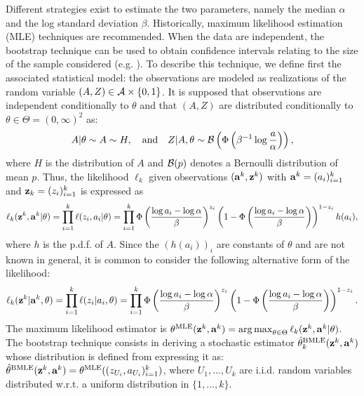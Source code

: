 Different strategies exist to estimate the two parameters, namely the median $\alpha$ and the log standard deviation $\beta$. Historically, maximum likelihood estimation (MLE) techniques are recommended.  %
When the data are independent, the bootstrap technique can be used to obtain confidence intervals relating to the size of the sample considered (e.g. \cite{shinozuka_statistical_2000,zentner_numerical_2010,wang_influence_2020}). %
To describe this technique,
we define first the associated statistical model: the observations are modeled as realizations of the random variable $(A,Z)\in\mathcal{A}\times\{0,1\}$. It is supposed that observations are independent conditionally to $\theta$ and that $(A,Z)$ are distributed conditionally to $\theta\in\Theta=(0,\infty)^2$ as:
    \begin{equation}
            A|\theta\sim A\sim H,\quad\text{and}\quad Z|A,\theta\sim\mathcal{B}\left(\Phi\left(\beta^{-1}\log\frac{a}{\alpha}\right)\right),
    \end{equation}
where $H$ is the distribution of $A$ and $\mathcal{B}(p)$ denotes a Bernoulli distribution of mean  $p$.
Thus, the likelihood $\ell_k$ given observations $(\mathbf{a}^k,\mathbf{z}^k)$ with $\mathbf{a}^k=(a_i)_{i=1}^k$ and $\mathbf{z}_k=(z_i)_{i=1}^{k}$ is expressed as
    \begin{equation}
        \ell_k(\mathbf{z}^k,\mathbf{a}^k|\theta) = \prod_{i=1}^k\ell(z_i,a_i|\theta) = \prod_{i=1}^k\Phi\left(\frac{\log a_i-\log\alpha}{\beta}\right)^{z_i}\left(1-\Phi\left(\frac{\log a_i-\log\alpha}{\beta}\right)\right)^{1-z_i}h(a_i),
    \end{equation}
where $h$ is the p.d.f. of $A$. Since the $(h(a_i))_i$ are constants of $\theta$ and are not known in general, it is common to consider the following alternative form of the likelihood:
\begin{equation}
    \ell_k(\mathbf{z}^k|\mathbf{a}^k,\theta) = \prod_{i=1}^k\ell(z_i|a_i,\theta) = \prod_{i=1}^k\Phi\left(\frac{\log a_i-\log\alpha}{\beta}\right)^{z_i}\left(1-\Phi\left(\frac{\log a_i-\log\alpha}{\beta}\right)\right)^{1-z_i}.
\end{equation}
The maximum likelihood estimator is $\theta^{\text{MLE}}(\mathbf{z}^k,\mathbf{a}^k)=\operatorname*{arg\,max}_{\theta\in\Theta}\ell_k(\mathbf{z}^k,\mathbf{a}^k|\theta)$.
The bootstrap technique consists in deriving a stochastic estimator $\hat\theta_k^{\text{BMLE}}(\mathbf{z}^k,\mathbf{a}^k)$ whose distribution is defined from expressing it as: $\hat\theta^{\text{BMLE}}(\mathbf{z}^k,\mathbf{a}^k)=\theta^{\text{MLE}}((z_{U_i},a_{U_i})_{i=1}^k)$, where $U_1,\dots,U_k$ are i.i.d. random variables distributed w.r.t. a uniform distribution in $\{1,\dots,k\}$.



